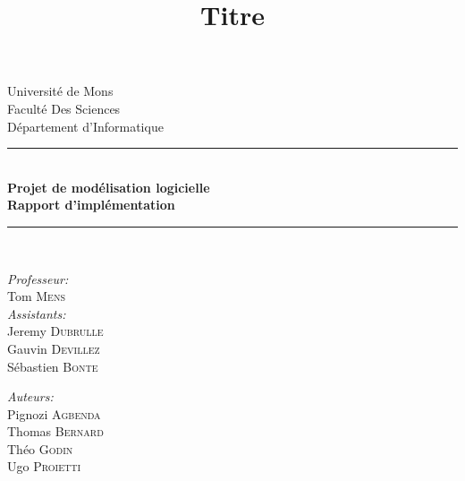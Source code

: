 \documentclass{article}
\title{Titre}
\author{ }
\date{ }
\begin{document}
\begin{titlepage}
    \begin{center}
        
        {\Large Université de Mons}\\[1ex]
        {\Large Faculté Des Sciences}\\[1ex]
        {\Large Département d'Informatique}\\[1ex]
        
        \newcommand{\HRule}{\rule{\linewidth}{0.3mm}}
        \HRule \\[0.3cm]
        { \LARGE \bfseries Projet de modélisation logicielle \\[0.3cm]}
        { \LARGE \bfseries Rapport d'implémentation  \\[0.1cm]} %
        \HRule \\[1.5cm]
        
        \begin{minipage}[t]{0.45\textwidth}
            \begin{flushleft} \large
                \emph{Professeur:}\\
                Tom \textsc{Mens}\\
                \emph{Assistants:}\\
                Jeremy \textsc{Dubrulle}\\
                Gauvin \textsc{Devillez}\\
                Sébastien \textsc{Bonte}\\
            \end{flushleft}
        \end{minipage}
        \begin{minipage}[t]{0.45\textwidth}
            \begin{flushright} \large
                \emph{Auteurs:} \\
                Pignozi \textsc{Agbenda} \\
                Thomas \textsc{Bernard} \\
                Théo \textsc{Godin} \\
                Ugo \textsc{Proietti}\\
            \end{flushright}
        \end{minipage}\\[2ex]
        
        \vfill
        

\end{center}
\end{titlepage}
\end{document}
